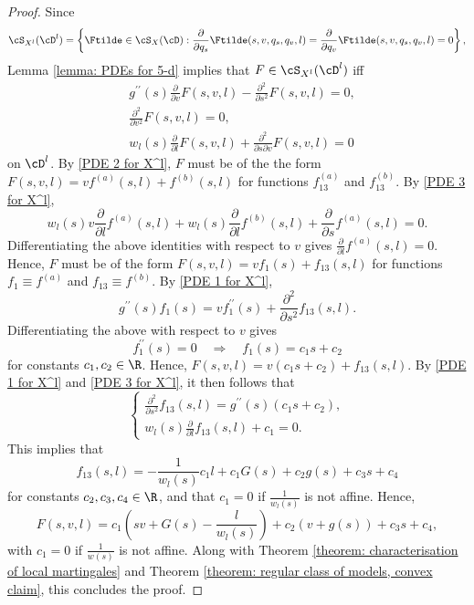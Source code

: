 \documentclass[11pt]{article}
\begin{document}
\begin{proof}

Since 
$$
\cS_{X^l}(\cD^l) = \left\{ \Ftilde \in \cS_X(\cD) : \frac{\partial}{\partial q_s} \Ftilde(s, v, q_s, q_v, l) = \frac{\partial}{\partial q_v} \Ftilde(s, v, q_s, q_v, l) = 0 \right\},
$$
Lemma \ref{lemma: PDEs for 5-d} implies that $F \in \cS_{X^l}(\cD^l)$ iff
\begin{align} 
&g^{\prime\prime}(s) \frac{\partial}{\partial v} F(s, v, l) - \frac{\partial^2}{\partial s^2} F(s, v, l) = 0, \label{PDE 1 for X^l} \\
%
%
%
&\frac{\partial^2}{\partial v^2} F(s, v, l) = 0, \label{PDE 2 for X^l} \\
&w_l(s) \frac{\partial}{\partial l} F(s, v, l) + \frac{\partial^2}{\partial s \partial v} F(s, v, l) = 0 \label{PDE 3 for X^l}
\end{align}
on $\cD^l$. By \eqref{PDE 2 for X^l}, $F$ must be of the the form $F(s, v, l) = v f^{(a)}(s, l) + f^{(b)}(s, l)$ for functions $f^{(a)}_{13}$ and $f^{(b)}_{13}$. By \eqref{PDE 3 for X^l},
$$
w_l(s) v \frac{\partial}{\partial l} f^{(a)}(s, l) + w_l(s) \frac{\partial}{\partial l} f^{(b)}(s, l) + \frac{\partial}{\partial s} f^{(a)}(s, l) = 0.
$$
Differentiating the above identities with respect to $v$ gives $\frac{\partial}{\partial l} f^{(a)}(s, l) = 0$. Hence, $F$ must be of the form $F(s, v, l) = v f_1(s) + f_{13}(s, l)$ for functions $f_1 \equiv f^{(a)}$ and $f_{13} \equiv f^{(b)}$. By \eqref{PDE 1 for X^l},
$$
g^{\prime\prime}(s) f_1(s) = v f_1^{\prime\prime}(s) + \frac{\partial^2}{\partial s^2} f_{13}(s, l).
$$
Differentiating the above with respect to $v$ gives
$$
f_1^{\prime\prime}(s) = 0 \quad \Rightarrow \quad f_1(s) = c_1 s + c_2
$$
for constants $c_1, c_2 \in \R$. Hence, $F(s, v, l) = v (c_1 s + c_2) + f_{13}(s, l)$. By \eqref{PDE 1 for X^l} and \eqref{PDE 3 for X^l}, it then follows that
$$
\begin{cases}
\frac{\partial^2}{\partial s^2} f_{13}(s, l) = g^{\prime\prime}(s) (c_1 s + c_2), \\
w_l(s) \frac{\partial}{\partial l} f_{13}(s, l) + c_1 = 0.
\end{cases}
$$
This implies that
$$
f_{13}(s, l) = -\frac{1}{w_l(s)} c_1 l + c_1 G(s) + c_2 g(s) + c_3 s + c_4
$$
for constants $c_2, c_3, c_4 \in \R$, and that $c_1 = 0$ if $\frac{1}{w_l(s)}$ is not affine. Hence,
$$
F(s, v, l) = c_1 \left( s v + G(s) - \frac{l}{w_l(s)} \right) + c_2(v + g(s)) + c_3 s + c_4,
$$
with $c_1 = 0$ if $\frac{1}{w(s)}$ is not affine. Along with Theorem \ref{theorem: characterisation of local martingales} and Theorem \ref{theorem: regular class of models, convex claim}, this concludes the proof.

\end{proof}
\end{document}
